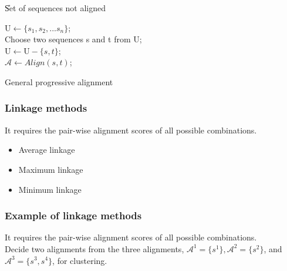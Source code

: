 \begin{algorithm}[H]
  
  \BlankLine
    
  \U{Set of sequences not aligned}
  
  \BlankLine \BlankLine
  
   $\mathrm{U} \leftarrow \{s_1, s_2, ... s_n\}$;\\
   Choose two sequences s and t from U;\\
   $\mathrm{U} \leftarrow \mathrm{U} - \{s, t\}$;\\
   $\mathcal{A} \leftarrow Align(s, t)$;

  \BlankLine \BlankLine


  \caption{General progressive alignment}

\end{algorithm}

%
%
\subsubsection*{Linkage methods}
It requires the pair-wise alignment scores of all possible combinations. 

\begin{itemize}
\item Average linkage
\item Maximum linkage
\item Minimum linkage
\end{itemize}

%
%
\subsubsection*{Example of linkage methods}
It requires the pair-wise alignment scores of all possible combinations. \\

\noindent
Decide two alignments from the three alignments, $\mathcal{A}^1 = \{s^1\}, \mathcal{A}^2 = \{s^2\}$, and $\mathcal{A}^3 = \{s^3, s^4\}$, for clustering.\\

